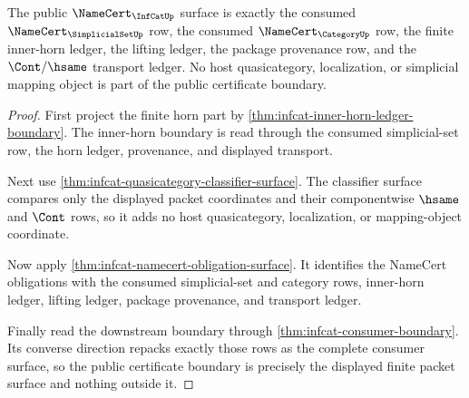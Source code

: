 \begin{theorem}
\label{thm:infcat-public-certificate-boundary}
The public $\NameCert_{\InfCatUp}$ surface is exactly the consumed
$\NameCert_{\SimplicialSetUp}$ row, the consumed $\NameCert_{\CategoryUp}$ row,
the finite inner-horn ledger, the lifting ledger, the package provenance row,
and the $\Cont/\hsame$ transport ledger. No host quasicategory, localization,
or simplicial mapping object is part of the public certificate boundary.
\end{theorem}
\begin{proof}
First project the finite horn part by
\autoref{thm:infcat-inner-horn-ledger-boundary}. The inner-horn boundary is read
through the consumed simplicial-set row, the horn ledger, provenance, and
displayed transport.

Next use \autoref{thm:infcat-quasicategory-classifier-surface}. The classifier
surface compares only the displayed packet coordinates and their componentwise
$\hsame$ and $\Cont$ rows, so it adds no host quasicategory, localization, or
mapping-object coordinate.

Now apply \autoref{thm:infcat-namecert-obligation-surface}. It identifies the
NameCert obligations with the consumed simplicial-set and category rows,
inner-horn ledger, lifting ledger, package provenance, and transport ledger.

Finally read the downstream boundary through
\autoref{thm:infcat-consumer-boundary}. Its converse direction repacks exactly
those rows as the complete consumer surface, so the public certificate boundary
is precisely the displayed finite packet surface and nothing outside it.
\end{proof}

